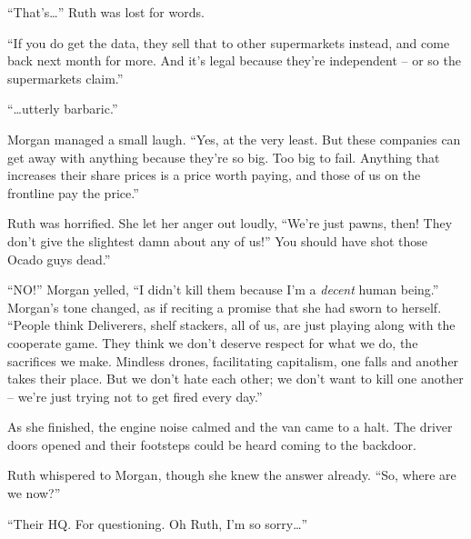 “That’s…” Ruth was lost for words. 

“If you do get the data, they sell that to other supermarkets instead, and come back next month for more. And it’s legal because they’re independent – or so the supermarkets claim.”

“…utterly barbaric.”

Morgan managed a small laugh. “Yes, at the very least. But these companies can get away with anything because they’re so big. Too big to fail. Anything that increases their share prices is a price worth paying, and those of us on the frontline pay the price.”

Ruth was horrified. She let her anger out loudly, “We’re just pawns, then! They don’t give the slightest damn about any of us!” You should have shot those Ocado guys dead.”

“NO!” Morgan yelled, “I didn’t kill them because I’m a \emph{decent} human being.” Morgan’s tone changed, as if reciting a promise that she had sworn to herself. “People think Deliverers, shelf stackers, all of us, are just playing along with the cooperate game. They think we don’t deserve respect for what we do, the sacrifices we make. Mindless drones, facilitating capitalism, one falls and another takes their place. But we don’t hate each other; we don’t want to kill one another – we’re just trying not to get fired every day.” 

As she finished, the engine noise calmed and the van came to a halt. The driver doors opened and their footsteps could be heard coming to the backdoor. 

Ruth whispered to Morgan, though she knew the answer already. “So, where are we now?”

“Their HQ. For questioning. Oh Ruth, I’m so sorry…”